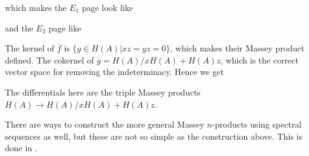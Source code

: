 which makes the $E_1$ page look like 
\begin{center}
\end{center}

and the $E_2$ page like 
\begin{center}
\end{center}

The kernel of $\overline{f}$ is $\{ y \in H(A)| xz = yz = 0\}$, which makes their Massey product defined. The cokernel of $\overline{g} = H(A)/xH(A)+H(A)z$, which is the correct vector space for removing the indeterminacy. Hence we get 

\begin{center}
\end{center}

The differentials here are the triple Massey products $H(A)\longrightarrow H(A)/xH(A)+H(A)z$.

There are ways to construct the more general Massey $n$-products using spectral sequences as well, but these are not so simple as the construction above. This is done in \cite[Section 4.]{massey}.


